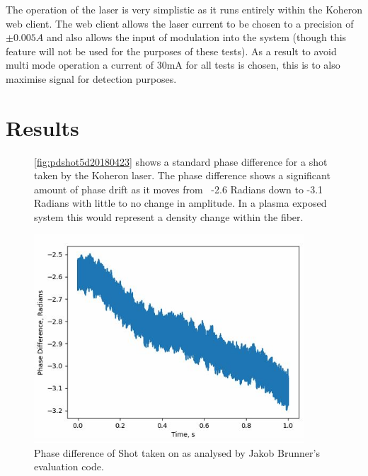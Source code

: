\documentclass[12pt,a4paper,oneside]{report}
\begin{document}
The operation of the laser is very simplistic as it runs entirely within the Koheron web client. The web client allows the laser current to be chosen to a precision of $\pm 0.005A$ and also allows the input of modulation into the system (though this feature will not be used for the purposes of these tests). As a result to avoid multi mode operation a current of 30mA for all tests is chosen, this is to also maximise signal for detection purposes.
\section{Results} \label{Section:RP_Drift}

\begin{figure}[H]
\autoref{fig:pdshot5d20180423} shows a standard phase difference for a shot taken by the Koheron laser. The phase difference shows a significant amount of phase drift as it moves from ~-2.6 Radians down to -3.1 Radians with little to no change in amplitude. In a plasma exposed system this would represent a density change within the fiber.

\includegraphics[width=0.9\textwidth, center,angle=0]{DImages/PD-shot-5-date-20180423.JPG}
\caption{Phase difference of Shot taken on as analysed by Jakob Brunner's evaluation code.}
\label{fig:pdshot5d20180423}
\end{figure}
\end{document}
